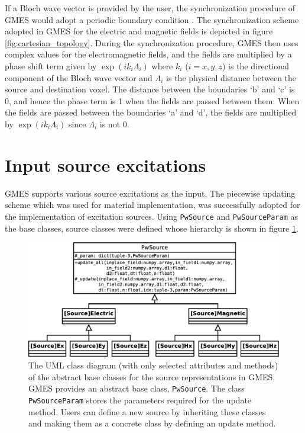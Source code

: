 If a Bloch wave vector is provided by the user, the synchronization procedure of GMES would adopt a periodic boundary condition \cite{joannopoulos_photonic_2008}. The synchronization scheme adopted in GMES for the electric and magnetic fields is depicted in figure \ref{fig:cartesian_topology}. During the synchronization procedure, GMES then uses complex values for the electromagnetic fields, and the fields are multiplied by a phase shift term given by $\exp(i k_i \Lambda_i)$ where $k_i$ ($i=x,y,z$) is the directional component of the Bloch wave vector and $\Lambda_i$ is the physical distance between the source and destination voxel. The distance between the boundaries `b' and `c' is 0, and hence the phase term is 1 when the fields are passed between them. When the fields are passed between the boundaries `a' and `d', the fields are multiplied by $\exp(i k_i \Lambda_i)$ since $\Lambda_i$ is not 0.

\section{Input source excitations}
\label{sec:source}
GMES supports various source excitations as the input. The piecewise updating scheme which was used for material implementation, was successfully adopted for the implementation of excitation sources. Using \texttt{PwSource} and \texttt{PwSourceParam} as the base classes, source classes were defined whose hierarchy is shown in figure \ref{fig:pwsource}.

\begin{figure}[hp!]
  \centering
  \includegraphics[keepaspectratio,width=\textwidth]{figure/pw_source}
  \caption{The UML class diagram (with only selected attributes and methods) of the abstract base classes for the source representations in GMES. GMES provides an abstract base class, \texttt{PwSource}. The class \texttt{PwSourceParam}  stores the parameters required for the update method. Users can define a new source by inheriting these classes and making them as a concrete class by defining an update method.}
  \label{fig:pwsource}
\end{figure}

